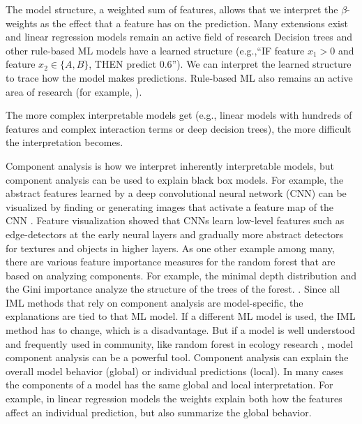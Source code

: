 \documentclass[runningheads]{llncs}
\begin{document}
The model structure, a weighted sum of features, allows that we interpret the $\beta$-weights as the effect that a feature has on the prediction.
Many extensions exist \cite{hastie1990generalized,fahrmeir2013multivariate,gelman2006data} and linear regression models remain an active field of research \cite{fasiolo2020scalable,caruana2015intelligible,fasiolo2020fast,ustun2016supersparse} 
Decision trees and other rule-based ML models have a learned structure (e.g.,\enquote{IF feature $x_1 > 0$ and feature $x_2 \in \{A,B\}$, THEN predict 0.6}).
We can interpret the learned structure to trace how the model makes predictions.
Rule-based ML also remains an active area of research (for example, \cite{wang2015falling,letham2015interpretable,hothorn2015ctree}).

The more complex interpretable models get (e.g., linear models with hundreds of features and complex interaction terms or deep decision trees), the more difficult the interpretation becomes.

Component analysis is how we interpret inherently interpretable models, but component analysis can be used to explain black box models.
For example, the abstract features learned by a deep convolutional neural network (CNN) can be visualized by finding or generating images that activate a feature map of the CNN \cite{olah2017feature}.
Feature visualization showed that CNNs learn low-level features such as edge-detectors at the early neural layers and gradually more abstract detectors for textures and objects in higher layers.
As one other example among many, there are various feature importance measures for the random forest that are based on analyzing components.
For example, the minimal depth distribution \cite{randomForestExplainer,ishwaran2010high} and the Gini importance \cite{breiman2001random} analyze the structure of the trees of the forest.
.
Since all IML methods that rely on component analysis are model-specific, the explanations are tied to that ML model.
If a different ML model is used, the IML method has to change, which is a disadvantage.
But if a model is well understood and frequently used in community, like random forest in ecology research \cite{cutler2007random}, model component analysis can be a powerful tool.
Component analysis can explain the overall model behavior (global) or individual predictions (local).
In many cases the components of a model has the same global and local interpretation.
For example, in linear regression models the weights explain both how the features affect an individual prediction, but also summarize the global behavior.
\end{document}
